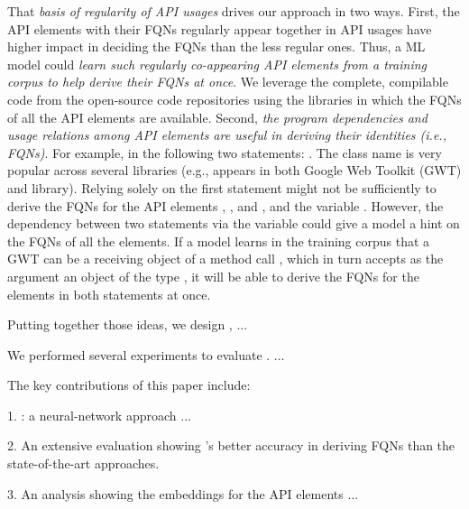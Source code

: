 That {\em basis of regularity of API usages} drives our approach in
two ways. First, the API elements with their FQNs regularly appear
together in API usages have higher impact in deciding the FQNs than
the less regular ones. Thus, a ML model could {\em learn such
  regularly co-appearing API elements from a training corpus to help
  derive their FQNs at once}. We leverage the complete, compilable
code from the open-source code repositories using the libraries in
which the FQNs of all the API elements are available. Second, {\em the
  program dependencies and usage relations among API elements are
  useful in deriving their identities (i.e., FQNs)}. For example, in
the following two statements: 
. The class name
 is very popular across several libraries (e.g.,
 appears in both Google Web Toolkit (GWT) and
 library). Relying solely on the first statement might
not be sufficiently to derive the FQNs for the API elements
, , and , and
the variable . However, the  dependency between
two statements via the variable  could give a model a hint on
the FQNs of all the elements.  If a model learns in the training
corpus that a GWT  can be a receiving object of a method
call , which in turn accepts as the
argument an object of the type , it will be able to
derive the FQNs for the elements in both statements at once.

Putting together those ideas, we design {\tool}, ...

We performed several experiments to evaluate {\tool}. ...

The key contributions of this paper include:

1. {\tool}: a neural-network approach ...


2. An extensive evaluation showing {\tool}'s better accuracy in
deriving FQNs than the state-of-the-art approaches.

3. An analysis showing the embeddings for the API elements ...
